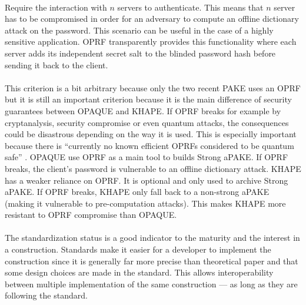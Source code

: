 ﻿\documentclass[../report.tex]{subfiles}
\begin{document}
\paragraph{}
Require the interaction with $n$ servers to authenticate. This means that $n$ server has to be compromised in order for an adversary to compute an offline dictionary attack on the password. This scenario can be useful in the case of a highly sensitive application.
OPRF transparently provides this functionality where each server adds its independent secret salt to the blinded password hash before sending it back to the client.


\paragraph{}
This criterion is a bit arbitrary because only the two recent PAKE uses an OPRF but it is still an important criterion because it is the main difference of security guarantees between OPAQUE and KHAPE.
If OPRF breaks for example by cryptanalysis, security compromise or even quantum attacks, the consequences could be disastrous depending on the way it is used. This is especially important because there is ``currently no known efficient OPRFs considered to be quantum safe'' \cite{KHAPE_Paper}.
OPAQUE use OPRF as a main tool to builds Strong aPAKE. If OPRF breaks, the client's password is vulnerable to an offline dictionary attack.
KHAPE has a weaker reliance on OPRF. It is optional and only used to archive Strong aPAKE. If OPRF breaks, KHAPE only fall back to a non-strong aPAKE (making it vulnerable to pre-computation attacks). 
This makes KHAPE more resistant to OPRF compromise than OPAQUE. 


\paragraph{}
The standardization status is a good indicator to the maturity and the interest in a construction.
Standards make it easier for a developer to implement the construction since it is generally far more precise than theoretical paper and that some design choices are made in the standard. This allows interoperability between multiple implementation of the same construction --- as long as they are following the standard.
\end{document}
